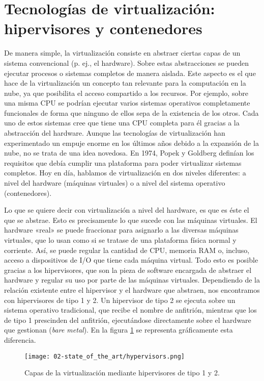 \section{Tecnologías de virtualización: hipervisores y contenedores}
\label{sec:02-virtualization}

De manera simple, la virtualización consiste en abstraer ciertas capas de un
sistema convencional (p. ej., el hardware). Sobre estas abstracciones se pueden
ejecutar procesos o sistemas completos de manera aislada. Este aspecto es el que
hace de la virtualización un concepto tan relevante para la computación en la
nube, ya que posibilita el acceso compartido a los recursos. Por ejemplo, sobre
una misma CPU se podrían ejecutar varios sistemas operativos completamente
funcionales de forma que ninguno de ellos sepa de la existencia de los otros.
Cada uno de estos sistemas cree que tiene una CPU completa para él gracias a la
abstracción del hardware. Aunque las tecnologías de virtualización han
experimentado un empuje enorme en los últimos años debido a la expansión de la
nube, no se trata de una idea novedosa. En 1974, Popek y Goldberg
\cite{popek_formal_1974} definían los requisitos que debía cumplir una
plataforma para poder virtualizar sistemas completos. Hoy en día, hablamos de
virtualización en dos niveles diferentes: a nivel del hardware (máquinas
virtuales) o a nivel del sistema operativo (contenedores).

Lo que se quiere decir con virtualización a nivel del hardware, es que es éste
el que se abstrae. Esto es precisamente lo que sucede con las máquinas
virtuales. El hardware «real» se puede fraccionar para asignarlo a las diversas
máquinas virtuales, que lo usan como si se tratase de una plataforma física
normal y corriente. Así, se puede regular la cantidad de CPU, memoria RAM o,
incluso, acceso a dispositivos de I/O que tiene cada máquina virtual. Todo esto
es posible gracias a los hipervisores, que son la pieza de software encargada de
abstraer el hardware y regular su uso por parte de las máquinas virtuales.
Dependiendo de la relación existente entre el hipervisor y el hardware que
abstraen, nos encontramos con hipervisores de tipo 1 y 2. Un hipervisor de tipo
2 se ejecuta sobre un sistema operativo tradicional, que recibe el nombre de
anfitrión, mientras que los de tipo 1 prescinden del anfitrión, ejecutándose
directamente sobre el hardware que gestionan (\textit{bare metal}). En la figura
\ref{fig:02-hypervisors} se representa gráficamente esta diferencia.

\begin{figure}
  \centering
  \texttt{[image: 02-state\_of\_the\_art/hypervisors.png]}
  \caption{Capas de la virtualización mediante hipervisores de tipo 1 y 2.}
  \label{fig:02-hypervisors}
\end{figure}

